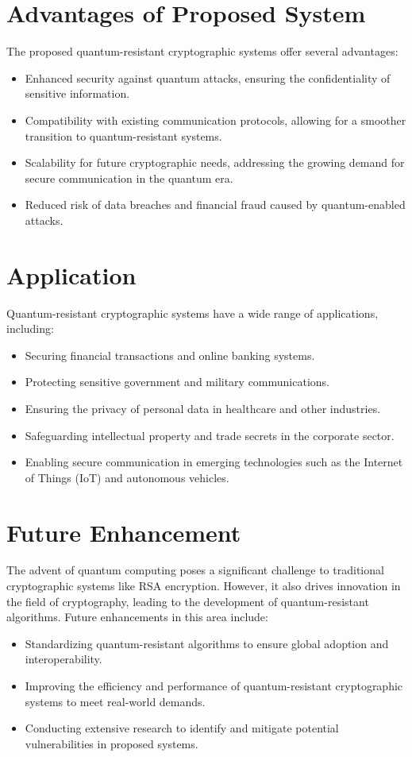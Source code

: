 \documentclass[12pt,a4paper]{report}
\begin{document}
\chapter{Advantages of Proposed System}
The proposed quantum-resistant cryptographic systems offer several advantages:
\begin{itemize}
    \item Enhanced security against quantum attacks, ensuring the confidentiality of sensitive information.
    \item Compatibility with existing communication protocols, allowing for a smoother transition to quantum-resistant systems.
    \item Scalability for future cryptographic needs, addressing the growing demand for secure communication in the quantum era.
    \item Reduced risk of data breaches and financial fraud caused by quantum-enabled attacks.
\end{itemize}

\chapter{Application}
Quantum-resistant cryptographic systems have a wide range of applications, including:
\begin{itemize}
    \item Securing financial transactions and online banking systems.
    \item Protecting sensitive government and military communications.
    \item Ensuring the privacy of personal data in healthcare and other industries.
    \item Safeguarding intellectual property and trade secrets in the corporate sector.
    \item Enabling secure communication in emerging technologies such as the Internet of Things (IoT) and autonomous vehicles.
\end{itemize}

\chapter{Future Enhancement}
The advent of quantum computing poses a significant challenge to traditional cryptographic systems like RSA encryption. However, it also drives innovation in the field of cryptography, leading to the development of quantum-resistant algorithms. Future enhancements in this area include:
\begin{itemize}
    \item Standardizing quantum-resistant algorithms to ensure global adoption and interoperability.
    \item Improving the efficiency and performance of quantum-resistant cryptographic systems to meet real-world demands.
    \item Conducting extensive research to identify and mitigate potential vulnerabilities in proposed systems.
\end{itemize}
\end{document}
